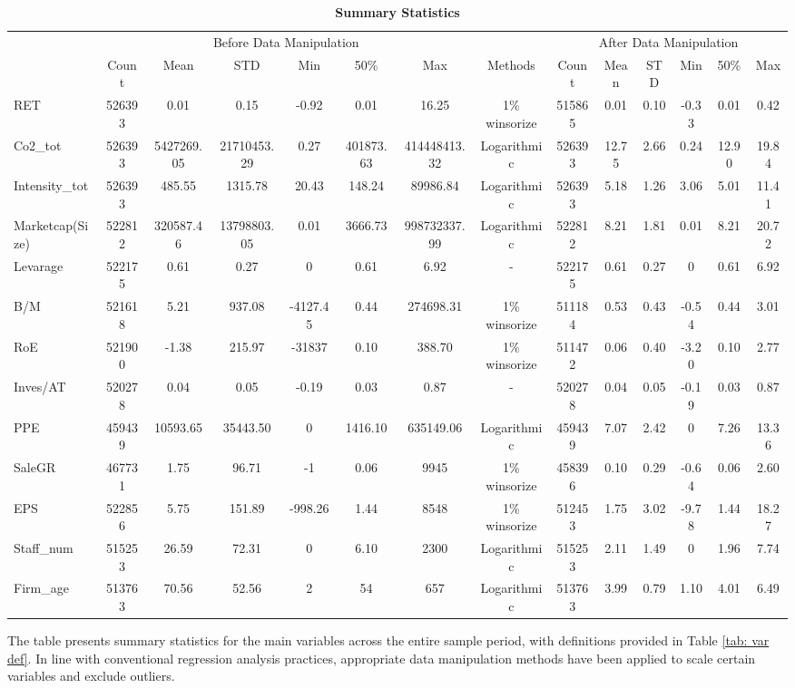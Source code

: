 \documentclass[12pt]{article}
\begin{document}
\begin{landscape}

\begin{table}[!ht]
\centering
\scriptsize
\caption{\textbf{Summary Statistics}}
\label{tab: summ stats}
\begin{tabular}{lccccccccccccc}
\toprule
& \multicolumn{6}{c}{Before Data Manipulation} & & \multicolumn{6}{c}{After Data Manipulation} \\ 
\cline{2-7} \cline{9-14}
 & Count & Mean & STD & Min & 50\% & Max & Methods & Count & Mean & STD & Min & 50\% & Max \\
\midrule
RET & 526393 & 0.01 & 0.15 & -0.92 & 0.01 & 16.25 & 1\% winsorize & 515865 & 0.01 & 0.10 & -0.33 & 0.01 & 0.42 \\
Co2\_tot & 526393 & 5427269.05 & 21710453.29 & 0.27 & 401873.63 & 414448413.32 & Logarithmic & 526393 & 12.75 & 2.66 & 0.24 & 12.90 & 19.84 \\
Intensity\_tot & 526393 & 485.55 & 1315.78 & 20.43 & 148.24 & 89986.84 & Logarithmic & 526393 & 5.18 & 1.26 & 3.06 & 5.01 & 11.41 \\
Marketcap(Size) & 522812 & 320587.46 & 13798803.05 & 0.01 & 3666.73 & 998732337.99 & Logarithmic & 522812 & 8.21 & 1.81 & 0.01 & 8.21 & 20.72 \\
Levarage & 522175 & 0.61 & 0.27 & 0 & 0.61 & 6.92 & - & 522175 & 0.61 & 0.27 & 0 & 0.61 & 6.92 \\
B/M & 521618 & 5.21 & 937.08 & -4127.45 & 0.44 & 274698.31 & 1\% winsorize & 511184 & 0.53 & 0.43 & -0.54 & 0.44 & 3.01 \\
RoE & 521900 & -1.38 & 215.97 & -31837 & 0.10 & 388.70 & 1\% winsorize & 511472 & 0.06 & 0.40 & -3.20 & 0.10 & 2.77 \\
Inves/AT & 520278 & 0.04 & 0.05 & -0.19 & 0.03 & 0.87 & - & 520278 & 0.04 & 0.05 & -0.19 & 0.03 & 0.87 \\
PPE & 459439 & 10593.65 & 35443.50 & 0 & 1416.10 & 635149.06 & Logarithmic & 459439 & 7.07 & 2.42 & 0 & 7.26 & 13.36 \\
SaleGR & 467731 & 1.75 & 96.71 & -1 & 0.06 & 9945 & 1\% winsorize & 458396 & 0.10 & 0.29 & -0.64 & 0.06 & 2.60 \\
EPS & 522856 & 5.75 & 151.89 & -998.26 & 1.44 & 8548 & 1\% winsorize & 512453 & 1.75 & 3.02 & -9.78 & 1.44 & 18.27 \\
Staff\_num & 515253 & 26.59 & 72.31 & 0 & 6.10 & 2300 & Logarithmic & 515253 & 2.11 & 1.49 & 0 & 1.96 & 7.74 \\
Firm\_age & 513763 & 70.56 & 52.56 & 2 & 54 & 657 & Logarithmic & 513763 & 3.99 & 0.79 & 1.10 & 4.01 & 6.49 \\
\bottomrule
\end{tabular}
\begin{tablenotes}
    \item The table presents summary statistics for the main variables across the entire sample period, with definitions provided in Table \ref{tab: var def}. In line with conventional regression analysis practices, appropriate data manipulation methods have been applied to scale certain variables and exclude outliers. 
\end{tablenotes}
\end{table}
        

\end{landscape}
\end{document}
